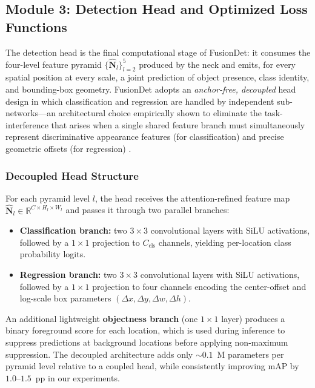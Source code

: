 
\subsection{Module 3: Detection Head and Optimized Loss
Functions}

The detection head is the final computational stage of
FusionDet: it consumes the four-level feature pyramid
$\{\hat{\mathbf{N}}_l\}_{l=2}^{5}$ produced by the neck and
emits, for every spatial position at every scale, a joint
prediction of object presence, class identity, and bounding-box
geometry. FusionDet adopts an \textit{anchor-free, decoupled}
head design in which classification and regression are handled
by independent sub-networks---an architectural choice
empirically shown to eliminate the task-interference that arises
when a single shared feature branch must simultaneously
represent discriminative appearance features (for
classification) and precise geometric offsets (for regression)
\cite{ge2021yolox}.

\subsubsection{Decoupled Head Structure}

For each pyramid level $l$, the head receives the
attention-refined feature map
$\hat{\mathbf{N}}_l \in \mathbb{R}^{C \times H_l \times W_l}$
and passes it through two parallel branches:

\begin{itemize}
  \item \textbf{Classification branch:} two $3\times3$
    convolutional layers with SiLU activations, followed by a
    $1\times1$ projection to $C_{\text{cls}}$ channels, yielding
    per-location class probability logits.
  \item \textbf{Regression branch:} two $3\times3$
    convolutional layers with SiLU activations, followed by a
    $1\times1$ projection to four channels encoding the
    center-offset and log-scale box parameters
    $(\Delta x, \Delta y, \Delta w, \Delta h)$.
\end{itemize}

An additional lightweight \textbf{objectness branch} (one
$1\times1$ layer) produces a binary foreground score for each
location, which is used during inference to suppress predictions
at background locations before applying non-maximum
suppression. The decoupled architecture adds only ${\sim}0.1$~M
parameters per pyramid level relative to a coupled head, while
consistently improving mAP by $1.0$--$1.5$~pp in our
experiments.

